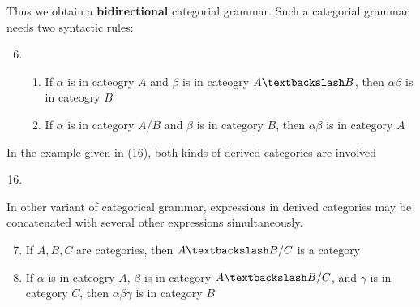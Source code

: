 \documentclass[11pt]{article}
\begin{document}
Thus we obtain a \textbf{bidirectional} categorial grammar. Such a categorial grammar
needs two syntactic rules:
\begin{enumerate}
\setcounter{enumi}{5}
\item \begin{enumerate}
\item If \(\alpha\) is in cateogry \(A\) and \(\beta\) is in cateogry \(A\textbackslash B\), then
\(\alpha\beta\) is in cateogry \(B\)
\item If \(\alpha\) is in category \(A/B\) and \(\beta\) is in category \(B\), then
\(\alpha\beta\) is in category \(A\)
\end{enumerate}
\end{enumerate}


In the example given in (16), both kinds of derived categories are involved
\begin{enumerate}
\setcounter{enumi}{15}
\item {}
\end{enumerate}


In other variant of categorical grammar, expressions in derived categories
may be concatenated with several other expressions simultaneously.
\begin{enumerate}
\setcounter{enumi}{6}
\item If \(A,B,C\) are categories, then \(A\textbackslash B/C\) is a category
\item If \(\alpha\) is in cateogry \(A\), \(\beta\) is in category \(A\textbackslash B/C\), and
\(\gamma\) is in category \(C\), then \(\alpha\beta\gamma\) is in category \(B\)
\end{enumerate}
\end{document}
